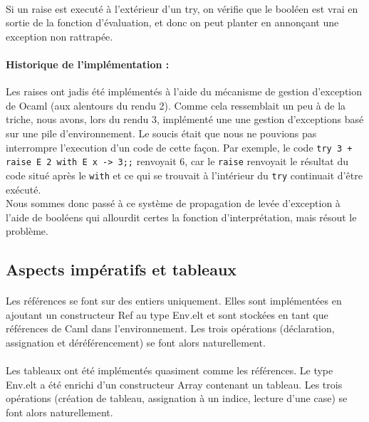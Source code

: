 \paragraph{} Si un raise est executé à l'extérieur d'un try, on vérifie que le booléen est vrai en sortie de la fonction d'évaluation, et donc on peut planter en annonçant une exception non rattrapée.

\paragraph{Historique de l'implémentation :} Les raises ont jadis été implémentés à l'aide du mécanisme de gestion d'exception de Ocaml (aux alentours du rendu 2). Comme cela ressemblait un peu à de la triche, nous avons, lors du rendu 3, implémenté une une gestion d'exceptions basé sur une pile d'environnement. Le soucis était que nous ne pouvions pas interrompre l'execution d'un code de cette façon. Par exemple, le code \texttt{try 3 + raise E 2 with E x -> 3;;} renvoyait 6, car le \texttt{raise} renvoyait le résultat du code situé après le \texttt{with} et ce qui se trouvait à l'intérieur du \texttt{try} continuait d'être exécuté. \\
Nous sommes donc passé à ce système de propagation de levée d'exception à l'aide de booléens qui allourdit certes la fonction d'interprétation, mais résout le problème.

\subsection{Aspects impératifs et tableaux}

\paragraph{} Les références se font sur des entiers uniquement. Elles sont implémentées en ajoutant un constructeur Ref au type Env.elt et sont stockées en tant que références de Caml dans l'environnement. Les trois opérations (déclaration, assignation et déréférencement) se font alors naturellement.

\paragraph{} Les tableaux ont été implémentés quasiment comme les références. Le type Env.elt a été enrichi d'un constructeur Array contenant un tableau. Les trois opérations (création de tableau, assignation à un indice, lecture d'une case) se font alors naturellement.




